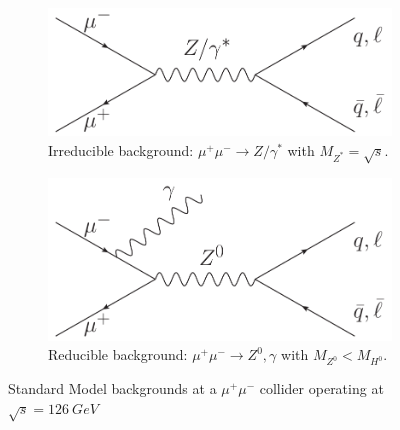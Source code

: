 \documentclass[a4paper]{article}
\begin{document}
\begin{figure}[h]
	\centering
	\begin{subfigure}[b]{0.4\textwidth}
		\centering
		\includegraphics[width=\textwidth]{mumu-zstar-ql}
		\caption{Irreducible background: $\mu^+\mu^-\rightarrow Z/\gamma^*$ with $M_{Z^*} = \sqrt{s}$.}
\label{fig:mumu-zstar-ql}
	\end{subfigure}
	\qquad
	\begin{subfigure}[b]{0.4\textwidth}
		\centering
		\includegraphics[width=\textwidth]{mumu-zg-ql}
		\caption{Reducible background: $\mu^+\mu^-\rightarrow Z^0,\gamma$ with $M_{Z^0} < M_{H^0}$.}
\label{fig:mumu-zg-ql}
	\end{subfigure}
	\caption{Standard Model backgrounds at a $\mu^+\mu^-$ collider operating at $\sqrt{s}=126\ GeV$}
\label{sm-bkg-feyn}
\end{figure}
\end{document}
